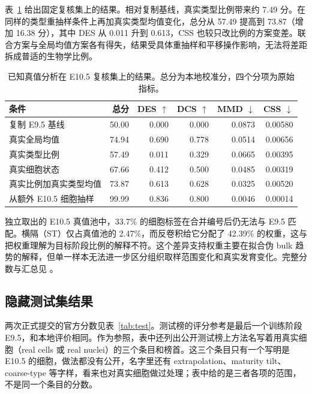\documentclass[UTF8,zihao=-4,fontset=none,a4paper]{ctexart}
\newcommand{\smalltable}{\small\renewcommand{\arraystretch}{1.2}}
\begin{document}
表~\ref{tab:oracle} 给出固定复核集上的结果。相对复制基线，真实类型比例带来约 7.49 分。在同样的类型重抽样条件上再加真实类型均值变化，总分从 57.49 提高到 73.87（增加 16.38 分），其中 DES 从 0.011 升到 0.613，CSS 也较只改比例的方案变差。联合方案与全局均值方案各有得失，结果受具体重抽样和平移操作影响，无法将差距拆成普适的生物学比例。

\begin{table}[htbp]
\centering\smalltable
\caption{已知真值分析在 E10.5 复核集上的结果。总分为本地校准分，四个分项为原始指标。}\label{tab:oracle}
\begin{tabular}{@{}lrrrrr@{}}
\toprule
条件 & 总分 & DES $\uparrow$ & DCS $\uparrow$ & MMD $\downarrow$ & CSS $\downarrow$\\
\midrule
复制 E9.5 基线 & 50.00 & 0.000 & 0.000 & 0.0873 & 0.00580\\
真实全局均值 & 74.94 & 0.690 & 0.778 & 0.0514 & 0.00656\\
真实类型比例 & 57.49 & 0.011 & 0.329 & 0.0665 & 0.00395\\
真实细胞状态 & 67.66 & 0.412 & 0.500 & 0.0485 & 0.00319\\
真实比例加真实类型均值 & 73.87 & 0.613 & 0.628 & 0.0325 & 0.00520\\
从额外 E10.5 细胞抽样 & 99.99 & 0.836 & 0.800 & 0.0046 & 0.00014\\
\bottomrule
\end{tabular}
\end{table}

独立取出的 E10.5 真值池中，33.7\% 的细胞标签在合并编号后仍无法与 E9.5 匹配。横隔（ST）仅占真值池的 2.47\%，而反卷积给它分配了 42.39\% 的权重，这与把权重理解为目标阶段比例的解释不符。这个差异支持权重主要在拟合伪 bulk 趋势的解释，但单一样本无法进一步区分组织取样范围变化和真实发育变化。完整分数与汇总见 。

\subsection{隐藏测试集结果}\label{sec:test}

两次正式提交的官方分数见表~\ref{tab:test}。测试榜的评分参考是最后一个训练阶段 E9.5，和本地评价相同。作为参照，表中还列出公开测试榜上方法名写着用真实细胞（real cells 或 real nuclei）的三个条目和榜首。这三个条目只有一个写明是 E10.5 的细胞，做法都没有公开，名字里还有 extrapolation、maturity tilt、coarse-type 等字样，看来也对真实细胞做过处理；表中给的是三者各项的范围，不是同一个条目的分数。
\end{document}
